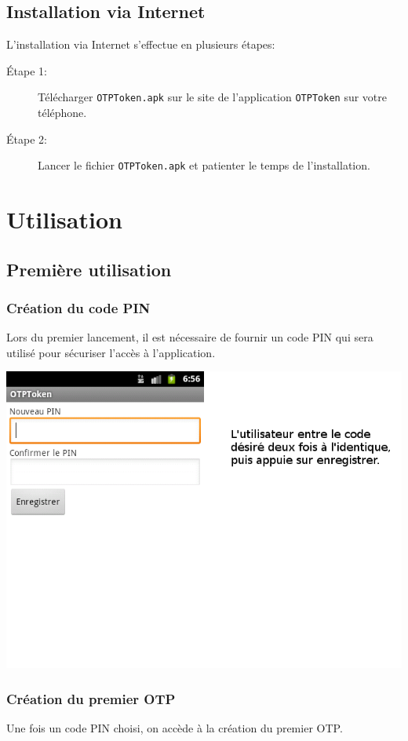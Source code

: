 \documentclass{../../../../res/univ-projet}
\begin{document}
\subsection{Installation via Internet}
L'installation via Internet s'effectue en plusieurs étapes:
\newline
\begin{description}
\item[Étape 1:] Télécharger \verb$OTPToken.apk$ sur le site de l'application \verb$OTPToken$ sur votre téléphone.
\item[Étape 2:]  Lancer le fichier \verb$OTPToken.apk$ et patienter le temps de l'installation. \footnotemark[\value{footnote}]
\end{description}
\newpage

\section{Utilisation}
\subsection{Première utilisation}
\subsubsection{Création du code PIN}
Lors du premier lancement, il est nécessaire de fournir un code PIN qui sera utilisé pour sécuriser l'accès à l'application.

\includegraphics[scale=0.5]{enterpin.png}


\subsubsection{Création du premier OTP}
Une fois un code PIN choisi, on accède à la création du premier OTP.
\end{document}
